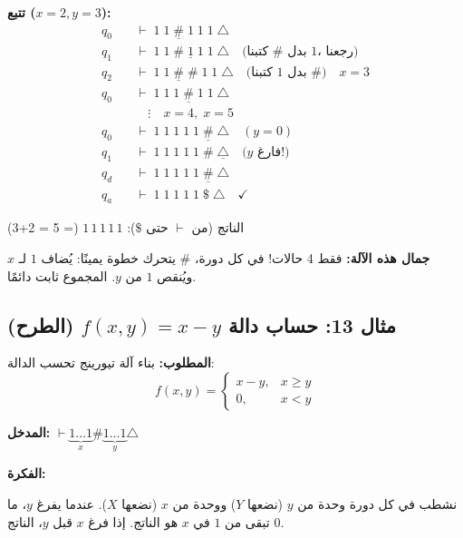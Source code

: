\documentclass[14pt]{extarticle}
\begin{document}
\textbf{تتبع ($x=2, y=3$):}
\begin{align*}
q_0 \quad &\vdash \; 1 \; 1 \; \underline{\#} \; 1 \; 1 \; 1 \; \triangle \\
q_1 \quad &\vdash \; 1 \; 1 \; \# \; \underline{1} \; 1 \; 1 \; \triangle \quad \text{(كتبنا $\#$ بدل $1$، رجعنا)} \\
q_2 \quad &\vdash \; 1 \; 1 \; \underline{\#} \; \# \; 1 \; 1 \; \triangle \quad \text{(كتبنا $1$ بدل $\#$)} \quad x{=}3 \\
q_0 \quad &\vdash \; 1 \; 1 \; 1 \; \underline{\#} \; 1 \; 1 \; \triangle \\
& \quad \vdots \quad x{=}4,\; x{=}5 \\
q_0 \quad &\vdash \; 1 \; 1 \; 1 \; 1 \; 1 \; \underline{\#} \; \triangle \quad (y{=}0) \\
q_1 \quad &\vdash \; 1 \; 1 \; 1 \; 1 \; 1 \; \# \; \underline{\triangle} \quad \text{($y$ فارغ!)} \\
q_d \quad &\vdash \; 1 \; 1 \; 1 \; 1 \; 1 \; \underline{\#} \; \triangle \\
q_a \quad &\vdash \; 1 \; 1 \; 1 \; 1 \; 1 \; \$ \; \triangle \quad \checkmark
\end{align*}

الناتج (من $\vdash$ حتى $\$$): $1\,1\,1\,1\,1$ (= 5 = 2+3) \checkmark

\begin{boxNote}
\textbf{جمال هذه الآلة:} فقط 4 حالات! في كل دورة، $\#$ يتحرك خطوة يمينًا: يُضاف $1$ لـ $x$ ويُنقص $1$ من $y$. المجموع ثابت دائمًا.
\end{boxNote}

\clearpage

\subsection{مثال 13: حساب دالة $f(x,y) = x - y$ (الطرح)}

\textbf{المطلوب:} بناء آلة تيورينج تحسب الدالة:
$$f(x, y) = \begin{cases} x - y, & x \geq y \\ 0, & x < y \end{cases}$$

\textbf{المدخل:} $\vdash \underbrace{1\ldots1}_{x} \# \underbrace{1\ldots1}_{y} \triangle$

\medskip
\textbf{الفكرة:}

نشطب في كل دورة وحدة من $y$ (نضعها $Y$) ووحدة من $x$ (نضعها $X$). عندما يفرغ $y$، ما تبقى من $1$ في $x$ هو الناتج. إذا فرغ $x$ قبل $y$، الناتج $0$.
\end{document}
